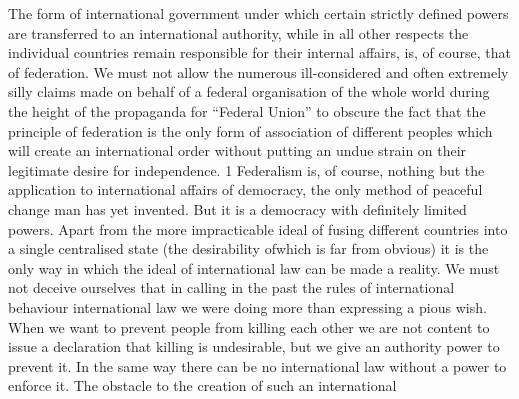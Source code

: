 \documentclass[11pt,openany]{book}
\begin{document}
The form of international government under which certain strictly defined powers are transferred to an international authority, while in all other respects the individual countries remain responsible for their internal affairs, is, of course, that of federation. We must not allow the numerous ill-considered and often extremely silly claims made on behalf of a federal organisation of the whole world during the height of the propaganda for ``Federal Union'' to obscure the fact that the principle of federation is the only form of association of different peoples which will create an international order without putting an undue strain on their legitimate desire for independence. 1 Federalism is, of course, nothing but the application to international affairs of democracy, the only method of peaceful change man has yet invented. But it is a democracy with definitely limited powers. Apart from the more impracticable ideal of fusing different countries into a single centralised state (the desirability ofwhich is far from obvious) it is the only way in which the ideal of international law can be made a reality. We must not deceive ourselves that in calling in the past the rules of international behaviour international law we were doing more than expressing a pious wish. When we want to prevent people from killing each other we are not content to issue a declaration that killing is undesirable, but we give an authority power to prevent it. In the same way there can be no international law without a power to enforce it. The obstacle to the creation of such an international
\end{document}
